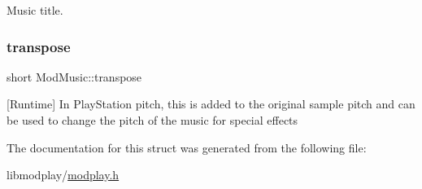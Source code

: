 Music title. 

\mbox{\label{structModMusic_a08eaea3acf218f237d5cfcb05870d7fc}} 
\subsubsection{\texorpdfstring{transpose}{transpose}}
{\footnotesize\ttfamily short Mod\+Music\+::transpose}



\mbox{[}Runtime\mbox{]} In Play\+Station pitch, this is added to the original sample pitch and can be used to change the pitch of the music for special effects 



The documentation for this struct was generated from the following file\+:\begin{DoxyCompactItemize}
\item 
libmodplay/\hyperlink{modplay_8h}{modplay.\+h}\end{DoxyCompactItemize}
